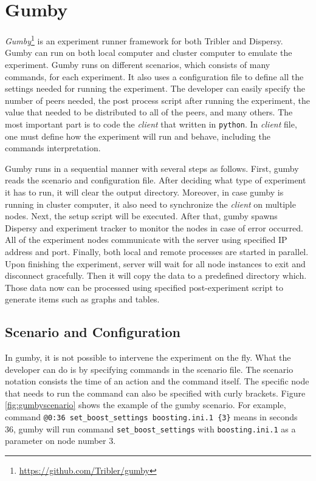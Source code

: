 \section{Gumby}
\label{section:gumby}
\textit{Gumby}\footnote{\url{https://github.com/Tribler/gumby}} is an experiment runner framework for both Tribler and Dispersy. Gumby can run on both local computer and cluster computer to emulate the experiment. Gumby runs on different scenarios, which consists of many commands, for each experiment. It also uses a configuration file to define all the settings needed for running the experiment. The developer can easily specify the number of peers needed, the post process script after running the experiment, the value that needed to be distributed to all of the peers, and many others. The most important part is to code the \textit{client} that written in \texttt{python}. In \textit{client} file, one must define how the experiment will run and behave, including the commands interpretation.

Gumby runs in a sequential manner with several steps as follows. First, gumby reads the scenario and configuration file. After deciding what type of experiment it has to run, it will clear the output directory. Moreover, in case gumby is running in cluster computer, it also need to synchronize the \textit{client} on multiple nodes. Next, the setup script will be executed. After that, gumby spawns Dispersy and experiment tracker to monitor the nodes in case of error occurred. All of the experiment nodes communicate with the server using specified IP address and port. Finally, both local and remote processes are started in parallel. Upon finishing the experiment, server will wait for all node instances to exit and disconnect gracefully. Then it will copy the data to a predefined directory which. Those data now can be processed using specified post-experiment script to generate items such as graphs and tables.

\subsection{Scenario and Configuration}
In gumby, it is not possible to intervene the experiment on the fly. What the developer can do is by specifying commands in the scenario file. The scenario notation consists the time of an action and the command itself. The specific node that needs to run the command can also be specified with curly brackets. Figure \ref{fig:gumbyscenario} shows the example of the gumby scenario. For example, command \texttt{@0:36 set\_boost\_settings boosting.ini.1 \{3\}} means in seconds 36, gumby will run command \texttt{set\_boost\_settings} with \texttt{boosting.ini.1} as a parameter on node number 3. 

